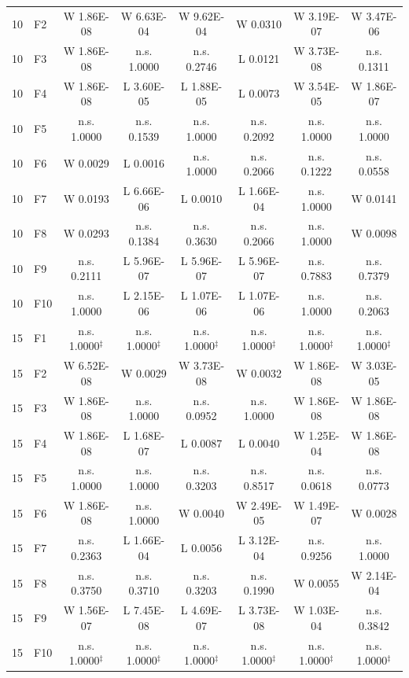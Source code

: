 \documentclass[algorithms,article,submit,moreauthors,pdftex]{Definitions/mdpi}
\begin{document}
\begin{table}[p]
{\begin{tabular}{clcccccc}
10 & F2 & W 1.86E-08 & W 6.63E-04 & W 9.62E-04 & W 0.0310 & W 3.19E-07 & W 3.47E-06 \\
10 & F3 & W 1.86E-08 & n.s. 1.0000 & n.s. 0.2746 & L 0.0121 & W 3.73E-08 & n.s. 0.1311 \\
10 & F4 & W 1.86E-08 & L 3.60E-05 & L 1.88E-05 & L 0.0073 & W 3.54E-05 & W 1.86E-07 \\
10 & F5 & n.s. 1.0000 & n.s. 0.1539 & n.s. 1.0000 & n.s. 0.2092 & n.s. 1.0000 & n.s. 1.0000 \\
10 & F6 & W 0.0029 & L 0.0016 & n.s. 1.0000 & n.s. 0.2066 & n.s. 0.1222 & n.s. 0.0558 \\
10 & F7 & W 0.0193 & L 6.66E-06 & L 0.0010 & L 1.66E-04 & n.s. 1.0000 & W 0.0141 \\
10 & F8 & W 0.0293 & n.s. 0.1384 & n.s. 0.3630 & n.s. 0.2066 & n.s. 1.0000 & W 0.0098 \\
10 & F9 & n.s. 0.2111 & L 5.96E-07 & L 5.96E-07 & L 5.96E-07 & n.s. 0.7883 & n.s. 0.7379 \\
10 & F10 & n.s. 1.0000 & L 2.15E-06 & L 1.07E-06 & L 1.07E-06 & n.s. 1.0000 & n.s. 0.2063 \\
\midrule
15 & F1 & n.s. 1.0000$^{\ddagger}$ & n.s. 1.0000$^{\ddagger}$ & n.s. 1.0000$^{\ddagger}$ & n.s. 1.0000$^{\ddagger}$ & n.s. 1.0000$^{\ddagger}$ & n.s. 1.0000$^{\ddagger}$ \\
15 & F2 & W 6.52E-08 & W 0.0029 & W 3.73E-08 & W 0.0032 & W 1.86E-08 & W 3.03E-05 \\
15 & F3 & W 1.86E-08 & n.s. 1.0000 & n.s. 0.0952 & n.s. 1.0000 & W 1.86E-08 & W 1.86E-08 \\
15 & F4 & W 1.86E-08 & L 1.68E-07 & L 0.0087 & L 0.0040 & W 1.25E-04 & W 1.86E-08 \\
15 & F5 & n.s. 1.0000 & n.s. 1.0000 & n.s. 0.3203 & n.s. 0.8517 & n.s. 0.0618 & n.s. 0.0773 \\
15 & F6 & W 1.86E-08 & n.s. 1.0000 & W 0.0040 & W 2.49E-05 & W 1.49E-07 & W 0.0028 \\
15 & F7 & n.s. 0.2363 & L 1.66E-04 & L 0.0056 & L 3.12E-04 & n.s. 0.9256 & n.s. 1.0000 \\
15 & F8 & n.s. 0.3750 & n.s. 0.3710 & n.s. 0.3203 & n.s. 0.1990 & W 0.0055 & W 2.14E-04 \\
15 & F9 & W 1.56E-07 & L 7.45E-08 & L 4.69E-07 & L 3.73E-08 & W 1.03E-04 & n.s. 0.3842 \\
15 & F10 & n.s. 1.0000$^{\ddagger}$ & n.s. 1.0000$^{\ddagger}$ & n.s. 1.0000$^{\ddagger}$ & n.s. 1.0000$^{\ddagger}$ & n.s. 1.0000$^{\ddagger}$ & n.s. 1.0000$^{\ddagger}$ \\

\end{tabular}}
\end{table}
\end{document}
